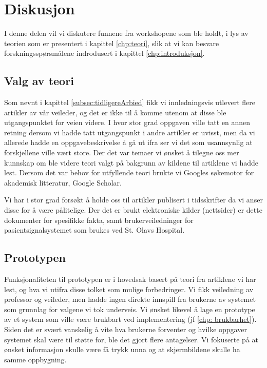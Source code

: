 \chapter{Diskusjon}
\label{chp:diskusjon}
I denne delen vil vi diskutere funnene fra workshopene som ble holdt, i lys av teorien som er presentert i kapittel \ref{chp:teori}, slik at vi kan besvare forskningsspørsmålene indrodusert i kapittel \ref{chp:introduksjon}.

\section{Valg av teori}
Som nevnt i kapittel \ref{subsec:tidligereArbied} fikk vi innledningsvis utlevert flere artikler av vår veileder, og det er ikke til å komme utenom at disse ble utgangspunktet for veien videre. I hvor stor grad oppgaven ville tatt en annen retning dersom vi hadde tatt utgangspunkt i andre artikler er uvisst, men da vi allerede hadde en oppgavebeskrivelse å gå ut ifra ser vi det som usannsynlig at forskjellene ville vært store.
Der det var temaer vi ønsket å tilegne oss mer kunnskap om ble videre teori valgt på bakgrunn av kildene til artiklene vi hadde lest. Dersom det var behov for utfyllende teori brukte vi Googles søkemotor for akademisk litteratur, Google Scholar. 

\noindent
Vi har i stor grad forsøkt å holde oss til artikler publisert i tidsskrifter da vi anser disse for å være pålitelige. Der det er brukt elektroniske kilder (nettsider) er dette dokumenter for spesifikke fakta, samt brukerveiledninger for pasientsignalsystemet som brukes ved St. Olavs Hospital. 

\section{Prototypen}
\label{protoDisk}
Funksjonaliteten til prototypen er i hovedsak basert på teori fra artiklene vi har lest, og hva vi utifra disse tolket som mulige forbedringer. Vi fikk veiledning av professor og veileder, men hadde ingen direkte innspill fra brukerne av systemet som grunnlag for valgene vi tok underveis.
Vi ønsket likevel å lage en prototype av et system som ville være brukbart ved implementering (jf \ref{chp: brukbarhet}). Siden det er svært vanskelig å vite hva brukerne forventer og hvilke oppgaver systemet skal være til støtte for, ble det gjort flere antagelser. Vi fokuserte på at ønsket informasjon skulle være få trykk unna og at skjermbildene skulle ha samme oppbygning.

